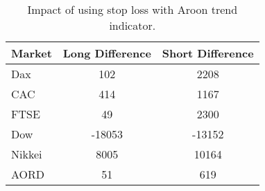 \begin{table}[ht]
\centering
\caption[Impact of using stop loss with Aroon trend indicator]{Impact of using stop loss with Aroon trend indicator.} 
\label{tab:aroon_results_sloss_diff}
\begin{tabular}{lcc}
  \toprule Market & Long Difference & Short Difference \\ 
  \midrule Dax & 102 & 2208 \\ 
  CAC & 414 & 1167 \\ 
  FTSE & 49 & 2300 \\ 
  Dow & -18053 & -13152 \\ 
  Nikkei & 8005 & 10164 \\ 
  AORD & 51 & 619 \\ 
   \bottomrule \end{tabular}
\end{table}
